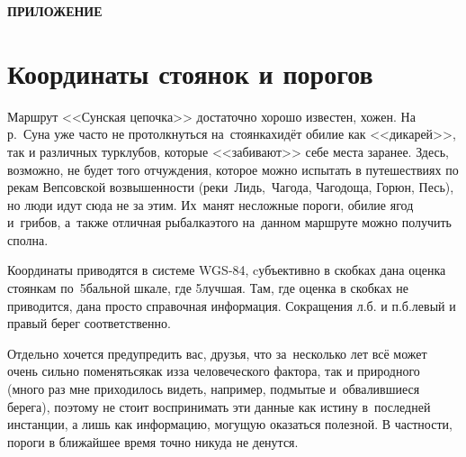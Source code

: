 {
\cleardoublepage
{}

\fancyhead[LE]{\fancyplain{}{}}
\fancyhead[RO]{\fancyplain{}{}}

{\hfill\large\textbf{ПРИЛОЖЕНИЕ}}
\section*{Координаты стоянок и порогов}
Маршрут <<Сунская цепочка>> достаточно хорошо известен, хожен. На р.\nobreakdash~Суна уже часто не протолкнуться на~стоянках\mdash идёт обилие как <<дикарей>>, так и различных турклубов, которые <<забивают>> себе места заранее. Здесь, возможно, не будет того отчуждения, которое можно испытать в путешествиях по рекам Вепсовской возвышенности (реки~Лидь,~Чагода, Чагодоща, Горюн, Песь\cite{СоболевЛидьЧагодаЧагодоща}), но люди идут сюда не за этим. Их~манят несложные пороги, обилие ягод и~грибов, а~также отличная рыбалка\mdash этого на~данном маршруте можно получить сполна. 

Координаты приводятся в системе WGS-84, cубъективно в скобках дана оценка стоянкам по~5\sdash бальной шкале, где 5\mdash лучшая. Там, где оценка в скобках не приводится, дана просто справочная информация. Сокращения л.б. и п.б.\mdash левый и правый берег соответственно.

Отдельно хочется предупредить вас, друзья, что за~несколько лет всё может очень сильно поменяться\mdash как из\sdash за человеческого фактора, так и природного (много раз мне приходилось видеть, например, подмытые и~обвалившиеся берега), поэтому не стоит воспринимать эти данные как истину в~последней инстанции, а лишь как информацию, могущую оказаться полезной. В частности, пороги в ближайшее время точно никуда не денутся.
%
\newpage 
}
